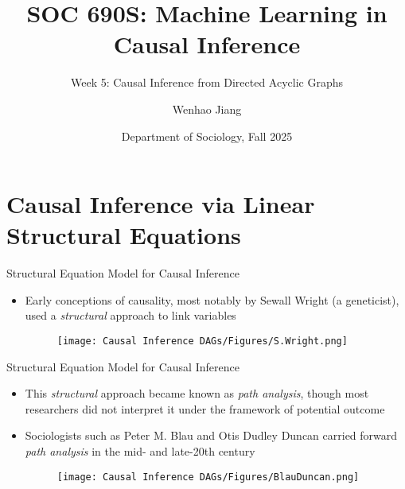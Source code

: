 \documentclass[aspectratio=1610,12pt,xcolor=dvipsnames]{beamer}
\title[CML]{SOC 690S: Machine Learning in Causal Inference\\[1.5pt]}
\subtitle{\large Week 5: Causal Inference from Directed Acyclic Graphs \\[-10pt]}
\author[Jiang] 
{\large Wenhao Jiang\vspace{-2em}}
\institute[Duke]{}
\date[Duke]
{\large Department of Sociology, Fall 2025}
\begin{document}

\begin{frame}
    \titlepage 
\end{frame}

\begin{frame}{}
\vspace{-1.4em}
\setlength{\tabcolsep}{1pt}
{\footnotesize}
\end{frame}

\section{Causal Inference via Linear Structural Equations}

\begin{frame}
  \sectionpage
\end{frame}

\begin{frame}{Structural Equation Model for Causal Inference}

\begin{itemize}
    \item Early conceptions of causality, most notably by Sewall Wright (a geneticist), used a \textit{structural} approach to link variables
    \begin{figure}
        \centering
        \texttt{[image: Causal Inference DAGs/Figures/S.Wright.png]}
    \end{figure}
\end{itemize}
\end{frame}

\begin{frame}{Structural Equation Model for Causal Inference}

\begin{itemize}
    \item This \textit{structural} approach became known as \textit{path analysis}, though most researchers did not interpret it under the framework of potential outcome
    \item Sociologists such as Peter M. Blau and Otis Dudley Duncan carried forward \textit{path analysis} in the mid- and late-20th century
    \begin{figure}
        \centering
        \texttt{[image: Causal Inference DAGs/Figures/BlauDuncan.png]}
    \end{figure}
\end{itemize}
\end{frame}
\end{document}
